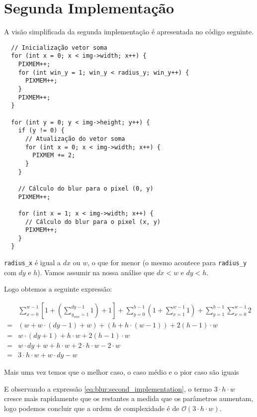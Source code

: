 \section{Segunda Implementação}

A visão simplificada da segunda implementação é apresentada no código seguinte.

\begin{listing}[H]
	\centering
	\begin{verbatim}
  // Inicialização vetor soma
  for (int x = 0; x < img->width; x++) {
    PIXMEM++;
    for (int win_y = 1; win_y < radius_y; win_y++) {
      PIXMEM++;
    }
    PIXMEM++;
  }

  for (int y = 0; y < img->height; y++) {
    if (y != 0) {
      // Atualização do vetor soma
      for (int x = 0; x < img->width; x++) {
        PIXMEM += 2;
      }
    }

    // Cálculo do blur para o pixel (0, y)
    PIXMEM++;

    for (int x = 1; x < img->width; x++) {
      // Cálculo do blur para o pixel (x, y)
      PIXMEM++;
    }
  }
  \end{verbatim}
\end{listing}

\Verb|radius_x| é igual a $dx$ ou $w$, o que for menor (o mesmo acontece para
\Verb|radius_y| com $dy$ e $h$). Vamos assumir na nossa análise que $dx < w$ e
$dy < h$.

Logo obtemos a seguinte expressão:

\begin{align}
	  & \sum_{x = 0}^{w - 1} \left[
		1
		+ \left(\sum_{y_{win} = 1}^{dy - 1} 1\right)
		+ 1
		\right]
	+ \sum_{y = 0}^{h - 1} \left( 1 + \sum_{x = 1}^{w - 1} 1 \right)
	+ \sum_{y = 1}^{h - 1} \sum_{x = 0}^{w - 1} 2                  \\
	= & \left( w + w \cdot (dy - 1) + w \right)
	+ \left( h + h \cdot (w - 1) \right)
	+ 2(h - 1) \cdot w                                             \\
	= & w \cdot (dy + 1) + h \cdot w + 2(h - 1) \cdot w            \\
	= & w \cdot dy + w + h \cdot w + 2 \cdot h \cdot w - 2 \cdot w \\
	= & 3 \cdot h \cdot w + w \cdot dy - w
	\label{eq:blur:second_implementation}
\end{align}

Mais uma vez temos que o melhor caso, o caso médio e o pior caso são iguais

E observando a expressão \eqref{eq:blur:second_implementation}, o termo
$3 \cdot h \cdot w$ cresce mais rapidamente que os restantes a medida que os
parâmetros aumentam, logo podemos concluir que a ordem de complexidade é de
$\mathcal{O}(3 \cdot h \cdot w)$.

